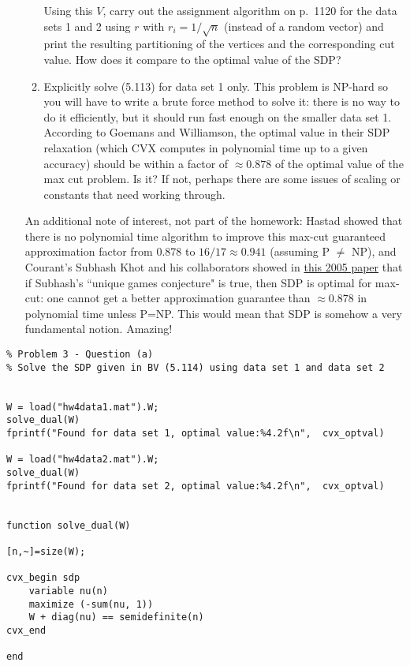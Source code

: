 \documentclass[11pt]{article}
\begin{document}
\begin{enumerate}
\begin{enumerate}
 Using this $V$, carry out the assignment algorithm on p.~1120 for the data sets 1 and 2 using $r$ with $r_i=1/\sqrt{n}$ 
 (instead of a random vector) and print the resulting partitioning of the
 vertices and the corresponding cut value. How does it compare to the optimal value of the SDP?

  
 \item Explicitly solve (5.113) for data set 1 only.
 This problem is NP-hard so you will have to write a brute force method to solve it: there is no way to do it efficiently, but it should
 run fast enough on the smaller data set 1. According to Goemans and Williamson,
 the optimal value in their SDP relaxation (which CVX computes in polynomial time up to a given accuracy)
 should be within a factor of $\approx 0.878$ of the optimal value of the max cut problem. Is it? If not, perhaps there are some issues of scaling
 or constants that need working through. 
 \end{enumerate}
 
 An additional note of interest, not part of the homework: 
Hastad showed that there is no polynomial time algorithm to improve
 this max-cut guaranteed approximation factor from 0.878 to $16/17\approx 0.941$ (assuming P $\not =$ NP), and 
 Courant's Subhash Khot and his collaborators showed in 
 \href{https://www.cs.cmu.edu/~odonnell/papers/maxcut.pdf}{this 2005 paper} that if Subhash's ``unique games conjecture" is true, then SDP is optimal for max-cut: one cannot get a better approximation
guarantee than $\approx 0.878$ in polynomial time unless P=NP. 
This would mean that SDP is somehow a very fundamental notion. Amazing!
 
\end{enumerate}

\begin{verbatim}
% Problem 3 - Question (a) 
% Solve the SDP given in BV (5.114) using data set 1 and data set 2


W = load("hw4data1.mat").W;
solve_dual(W)
fprintf("Found for data set 1, optimal value:%4.2f\n",  cvx_optval)

W = load("hw4data2.mat").W;
solve_dual(W)
fprintf("Found for data set 2, optimal value:%4.2f\n",  cvx_optval)


function solve_dual(W)

[n,~]=size(W);

cvx_begin sdp
    variable nu(n)
    maximize (-sum(nu, 1))
    W + diag(nu) == semidefinite(n)
cvx_end

end

\end{verbatim}
\end{document}
